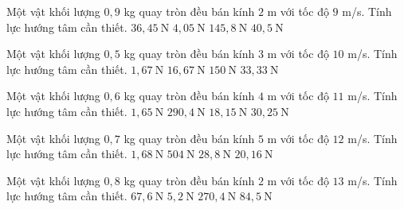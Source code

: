 \begin{ex}
Một vật khối lượng $0,9$ kg quay tròn đều bán kính $2$ m với tốc độ $9$ m/s. Tính lực hướng tâm cần thiết.
\choice
{\True $36,45\ \mathrm{N}$}
{$4,05\ \mathrm{N}$}
{$145,8\ \mathrm{N}$}
{$40,5\ \mathrm{N}$}
\end{ex}

\begin{ex}
Một vật khối lượng $0,5$ kg quay tròn đều bán kính $3$ m với tốc độ $10$ m/s. Tính lực hướng tâm cần thiết.
\choice
{$1,67\ \mathrm{N}$}
{\True $16,67\ \mathrm{N}$}
{$150\ \mathrm{N}$}
{$33,33\ \mathrm{N}$}
\end{ex}

\begin{ex}
Một vật khối lượng $0,6$ kg quay tròn đều bán kính $4$ m với tốc độ $11$ m/s. Tính lực hướng tâm cần thiết.
\choice
{$1,65\ \mathrm{N}$}
{$290,4\ \mathrm{N}$}
{\True $18,15\ \mathrm{N}$}
{$30,25\ \mathrm{N}$}
\end{ex}

\begin{ex}
Một vật khối lượng $0,7$ kg quay tròn đều bán kính $5$ m với tốc độ $12$ m/s. Tính lực hướng tâm cần thiết.
\choice
{$1,68\ \mathrm{N}$}
{$504\ \mathrm{N}$}
{$28,8\ \mathrm{N}$}
{\True $20,16\ \mathrm{N}$}
\end{ex}

\begin{ex}
Một vật khối lượng $0,8$ kg quay tròn đều bán kính $2$ m với tốc độ $13$ m/s. Tính lực hướng tâm cần thiết.
\choice
{\True $67,6\ \mathrm{N}$}
{$5,2\ \mathrm{N}$}
{$270,4\ \mathrm{N}$}
{$84,5\ \mathrm{N}$}
\end{ex}

